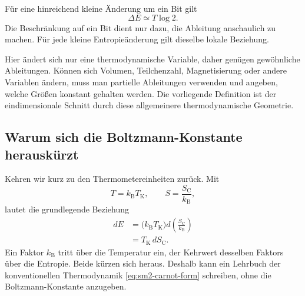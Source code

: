 Für eine hinreichend kleine Änderung um ein Bit gilt
\begin{equation}
 \Delta E\simeq T\log2.
 \label{eq:sm2-one-bit-energy}
\end{equation}
Die Beschränkung auf ein Bit dient nur dazu, die Ableitung anschaulich zu machen. Für jede kleine Entropieänderung gilt dieselbe lokale Beziehung.

\begin{classroomqa}
\end{classroomqa}

Hier ändert sich nur eine thermodynamische Variable, daher genügen gewöhnliche Ableitungen. Können sich Volumen, Teilchenzahl, Magnetisierung oder andere Variablen ändern, muss man partielle Ableitungen verwenden und angeben, welche Größen konstant gehalten werden. Die vorliegende Definition ist der eindimensionale Schnitt durch diese allgemeinere thermodynamische Geometrie.

\subsection{Warum sich die Boltzmann-Konstante herauskürzt}

Kehren wir kurz zu den Thermometereinheiten zurück. Mit
\[
 T=k_{\mathrm B}T_{\mathrm K},
 \qquad
 S=\frac{S_{\mathrm C}}{k_{\mathrm B}},
\]
lautet die grundlegende Beziehung
\begin{align}
 dE
 &=\bigl(k_{\mathrm B}T_{\mathrm K}\bigr)
   d\left(\frac{S_{\mathrm C}}{k_{\mathrm B}}\right)\\
 &=T_{\mathrm K}\,dS_{\mathrm C}.
 \label{eq:sm2-carnot-form}
\end{align}
Ein Faktor \(k_{\mathrm B}\) tritt über die Temperatur ein, der Kehrwert desselben Faktors über die Entropie. Beide kürzen sich heraus. Deshalb kann ein Lehrbuch der konventionellen Thermodynamik \eqref{eq:sm2-carnot-form} schreiben, ohne die Boltzmann-Konstante anzugeben.

\begin{classroomqa}
\end{classroomqa}

